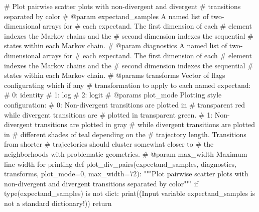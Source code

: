 \documentclass[
  letterpaper,
  DIV=11,
  numbers=noendperiod]{scrartcl}
\newenvironment{Shaded}{\begin{snugshade}}{\end{snugshade}}
\newcommand{\BuiltInTok}[1]{\textcolor[rgb]{0.00,0.23,0.31}{#1}}
\newcommand{\CommentTok}[1]{\textcolor[rgb]{0.37,0.37,0.37}{#1}}
\newcommand{\ControlFlowTok}[1]{\textcolor[rgb]{0.00,0.23,0.31}{#1}}
\newcommand{\DecValTok}[1]{\textcolor[rgb]{0.68,0.00,0.00}{#1}}
\newcommand{\KeywordTok}[1]{\textcolor[rgb]{0.00,0.23,0.31}{#1}}
\newcommand{\NormalTok}[1]{\textcolor[rgb]{0.00,0.23,0.31}{#1}}
\newcommand{\OperatorTok}[1]{\textcolor[rgb]{0.37,0.37,0.37}{#1}}
\newcommand{\StringTok}[1]{\textcolor[rgb]{0.13,0.47,0.30}{#1}}
\begin{document}
\begin{Shaded}
\begin{Highlighting}[]
\CommentTok{\# Plot pairwise scatter plots with non{-}divergent and divergent }
\CommentTok{\# transitions separated by color}
\CommentTok{\# @param expectand\_samples A named list of two{-}dimensional arrays for }
\CommentTok{\#                          each expectand.  The first dimension of each}
\CommentTok{\#                          element indexes the Markov chains and the }
\CommentTok{\#                          second dimension indexes the sequential }
\CommentTok{\#                          states within each Markov chain.}
\CommentTok{\# @param diagnostics A named list of two{-}dimensional arrays for }
\CommentTok{\#                    each expectand.  The first dimension of each}
\CommentTok{\#                    element indexes the Markov chains and the }
\CommentTok{\#                    second dimension indexes the sequential }
\CommentTok{\#                    states within each Markov chain.}
\CommentTok{\# @params transforms Vector of flags configurating which if any}
\CommentTok{\#                    transformation to apply to each named expectand:}
\CommentTok{\#                      0: identity}
\CommentTok{\#                      1: log}
\CommentTok{\#                      2: logit}
\CommentTok{\# @params plot\_mode Plotting style configuration: }
\CommentTok{\#                     0: Non{-}divergent transitions are plotted in }
\CommentTok{\#                        transparent red while divergent transitions are}
\CommentTok{\#                        plotted in transparent green.}
\CommentTok{\#                     1: Non{-}divergent transitions are plotted in gray }
\CommentTok{\#                        while divergent transitions are plotted in }
\CommentTok{\#                        different shades of teal depending on the }
\CommentTok{\#                        trajectory length.  Transitions from shorter}
\CommentTok{\#                        trajectories should cluster somewhat closer to }
\CommentTok{\#                        the neighborhoods with problematic geometries.}
\CommentTok{\# @param max\_width Maximum line width for printing}
\KeywordTok{def}\NormalTok{ plot\_div\_pairs(expectand\_samples, diagnostics, transforms, }
\NormalTok{                   plot\_mode}\OperatorTok{=}\DecValTok{0}\NormalTok{, max\_width}\OperatorTok{=}\DecValTok{72}\NormalTok{):}
  \CommentTok{"""Plot pairwise scatter plots with non{-}divergent and divergent }
\CommentTok{     transitions separated by color"""}
  \ControlFlowTok{if} \BuiltInTok{type}\NormalTok{(expectand\_samples) }\KeywordTok{is} \KeywordTok{not} \BuiltInTok{dict}\NormalTok{:}
    \BuiltInTok{print}\NormalTok{((}\StringTok{\textquotesingle{}Input variable \textasciigrave{}expectand\_samples\textasciigrave{} \textquotesingle{}}
           \StringTok{\textquotesingle{}is not a standard dictionary!\textquotesingle{}}\NormalTok{))}
    \ControlFlowTok{return}
  

\end{Highlighting}
\end{Shaded}
\end{document}
